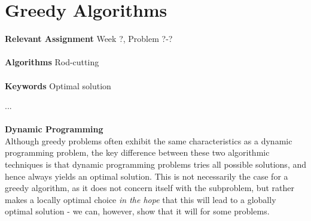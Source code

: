 
\chapter{Greedy Algorithms}
\label{ch:greedyalgorithms}

\textbf{Relevant Assignment} Week ?, Problem ?-? \\\\
\textbf{Algorithms} Rod-cutting \\\\
\textbf{Keywords} Optimal solution
\vspace{1in}

\noindent ...
\\\\
\noindent \textbf{Dynamic Programming} \\
Although greedy problems often exhibit the same characteristics as a dynamic
programming problem, the key difference between these two algorithmic
techniques is that dynamic programming problems tries all possible solutions,
and hence always yields an optimal solution. This is not necessarily the case
for a greedy algorithm, as it does not concern itself with the subproblem, but
rather makes a locally optimal choice \textit{in the hope} that this will lead
to a globally optimal solution - we can, however, show that it will for some
problems.

